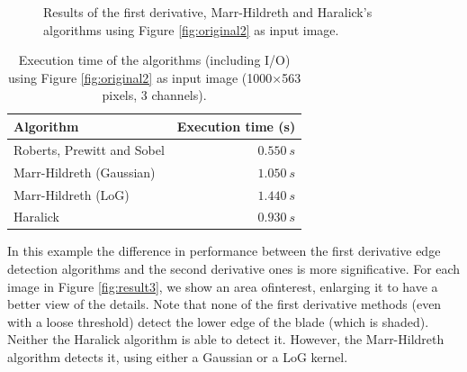 \documentclass{ipol}
\numberwithin{equation}{section}
\numberwithin{table}{section}
\begin{document}
\begin{figure}[h!]
	\quad
	\caption{Results of the first derivative, Marr-Hildreth and Haralick's algorithms using Figure \ref{fig:original2} as input image.}
	\label{fig:result2}
\end{figure}

\begin{table}[t!]
	\begin{center}
	\begin{tabular}{| l | r |}
		\hline \rule{0pt}{3ex}
		\cellcolor[gray]{0.8} \textbf{Algorithm}	& \cellcolor[gray]{0.8} \textbf{Execution time (s)}	\\ \hline \rule{0pt}{3ex}
		Roberts, Prewitt and Sobel					& $0.550 \ s$										\\ \hline \rule{0pt}{3ex}
		Marr-Hildreth (Gaussian)					& $1.050 \ s$										\\ \hline \rule{0pt}{3ex}
		Marr-Hildreth (LoG)							& $1.440 \ s$										\\ \hline \rule{0pt}{3ex}
		Haralick									& $0.930 \ s$										\\
		\hline
	\end{tabular}
	\end{center}
	\caption{Execution time of the algorithms (including I/O) using Figure \ref{fig:original2} as input image (1000$\times$563 pixels, 3 channels).}
	\label{exectime2}
\end{table}

In this example the difference in performance between the first derivative edge detection algorithms and the second derivative ones is more significative.  For each image in Figure \ref{fig:result3}, we show an area of ​​interest, enlarging it to have a better view of the details. Note that none of the first derivative methods (even with a loose threshold) detect the lower edge of the blade (which is shaded). Neither the Haralick algorithm is able to detect it. However, the Marr-Hildreth algorithm detects it, using either a Gaussian or a LoG kernel. 
\end{document}

